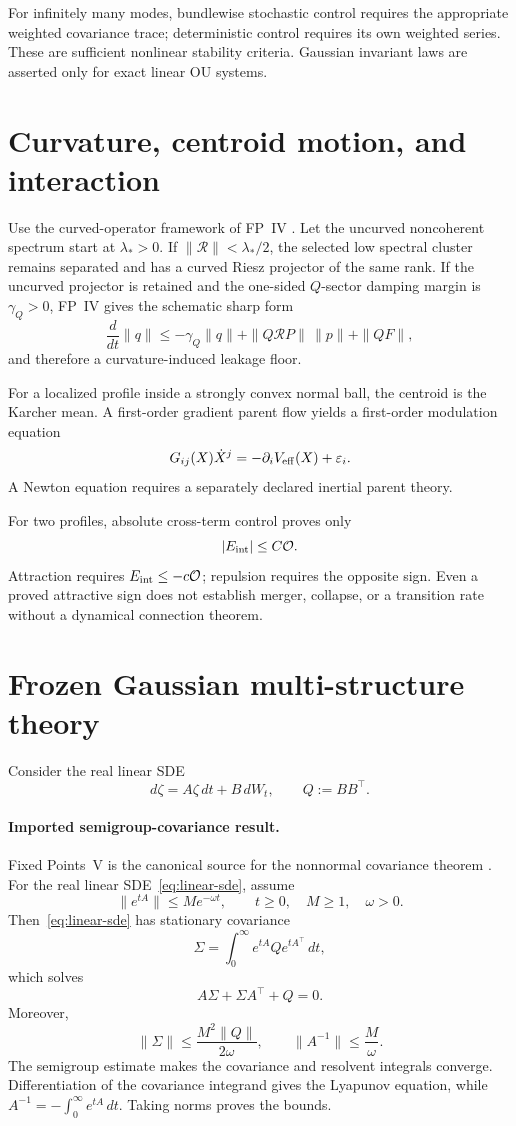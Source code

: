 \documentclass[11pt]{article}
\begin{document}
For infinitely many modes, bundlewise stochastic control requires the
appropriate weighted covariance trace; deterministic control requires its
own weighted series. These are sufficient nonlinear stability criteria.
Gaussian invariant laws are asserted only for exact linear OU systems.

\section{Curvature, centroid motion, and interaction}

Use the curved-operator framework of FP~IV \cite{FPIV}. Let the uncurved
noncoherent spectrum start at $\lambda_\ast>0$. If
$\|\mathcal R\|<\lambda_\ast/2$, the selected low spectral cluster remains
separated and has a curved Riesz projector of the same rank. If the uncurved
projector is retained and the one-sided $Q$-sector damping margin is
$\gamma_Q>0$, FP~IV gives the schematic sharp form
\[
 \frac{d}{dt}\|q\|
 \le-\gamma_Q\|q\|+\|Q\mathcal RP\|\,\|p\|+\|QF\|,
\]
and therefore a curvature-induced leakage floor.

For a localized profile inside a strongly convex normal ball, the centroid is
the Karcher mean. A first-order gradient parent flow yields a first-order
modulation equation
\[
 G_{ij}(X)\dot X^j=-\partial_iV_{\rm eff}(X)+\varepsilon_i.
\]
A Newton equation requires a separately declared inertial parent theory.

For two profiles, absolute cross-term control proves only
\[
 |E_{\rm int}|\le C\mathcal O.
\]
Attraction requires $E_{\rm int}\le-c\mathcal O$; repulsion requires the
opposite sign. Even a proved attractive sign does not establish merger,
collapse, or a transition rate without a dynamical connection theorem.

\section{Frozen Gaussian multi-structure theory}

Consider the real linear SDE
\begin{equation}
 d\zeta=A\zeta\,dt+B\,dW_t,
 \qquad Q:=BB^\top .
 \label{eq:linear-sde}
\end{equation}

\paragraph{Imported semigroup-covariance result.}
Fixed Points~V is the canonical source for the nonnormal covariance theorem
\cite{FPV}. For the real linear SDE~\eqref{eq:linear-sde}, assume
\[
 \|e^{tA}\|\le M e^{-\omega t},
 \qquad t\ge0,\quad M\ge1,\quad\omega>0.
\]
Then~\eqref{eq:linear-sde} has stationary covariance
\[
 \Sigma=\int_0^\infty e^{tA}Qe^{tA^\top}\,dt,
\]
which solves
\[
 A\Sigma+\Sigma A^\top+Q=0.
\]
Moreover,
\[
 \|\Sigma\|\le\frac{M^2\|Q\|}{2\omega},
 \qquad
 \|A^{-1}\|\le\frac{M}{\omega}.
\]
The semigroup estimate makes the covariance and resolvent integrals converge.
Differentiation of the
covariance integrand gives the Lyapunov equation, while
$A^{-1}=-\int_0^\infty e^{tA}\,dt$. Taking norms proves the bounds.
\end{document}
